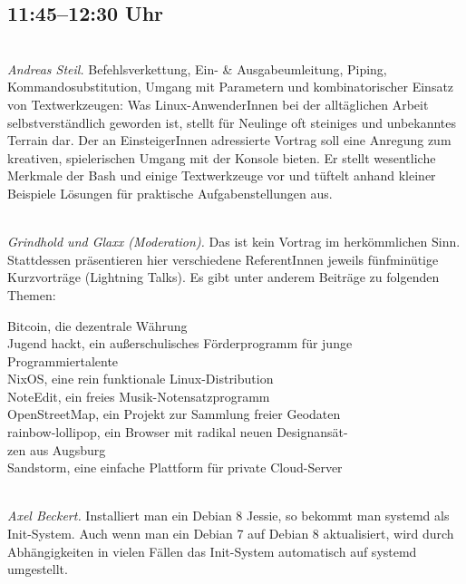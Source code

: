 \documentclass[10pt,a4paper,ngerman]{scrartcl}
\let\origdescription\description
\renewenvironment{description}{
  \setlength{\leftmargini}{0em}
  \origdescription
  \setlength{\itemindent}{0em}
  \setlength{\itemsep}{1.2em}
  \setlength{\labelsep}{\textwidth}
}
{\endlist}
\newcommand{\vorschub}{\mbox{}\\[-0.5em]}
\begin{document}
\begin{multicols}{2}
\begin{description}
\end{description}

\columnbreak

\section{11:45--12:30 Uhr}
\begin{description}
\item[Some Bashing – Kommandozeile für Einsteiger]\vorschub
\textsl{Andreas Steil.}
Befehlsverkettung, Ein- \& Ausgabeumleitung, Piping, Kommandosubstitution, Umgang mit Parametern und kombinatorischer Einsatz von Textwerkzeugen: Was Linux-AnwenderInnen bei der alltäglichen Arbeit selbstverständlich geworden ist, stellt für Neulinge oft steiniges und unbekanntes Terrain dar. Der an EinsteigerInnen adressierte Vortrag soll eine Anregung zum kreativen, spielerischen Umgang mit der Konsole bieten. Er stellt wesentliche Merkmale der Bash und einige Textwerkzeuge vor und tüftelt anhand kleiner Beispiele Lösungen für praktische Aufgabenstellungen aus.



\item[Lightning Talks]\vorschub
\textsl{Grindhold und Glaxx (Moderation).}
Das ist kein Vortrag im herkömmlichen Sinn. Stattdessen präsentieren hier verschiedene ReferentInnen jeweils fünfminütige Kurzvorträge (Lightning Talks). Es gibt unter anderem Beiträge zu folgenden Themen:

\textbullet{} Bitcoin, die dezentrale Währung \\[0.3em]
\textbullet{} Jugend hackt, ein außerschulisches Förderprogramm für junge \\
\phantom{\textbullet} Programmiertalente \\[0.3em]
\textbullet{} NixOS, eine rein funktionale Linux-Distribution \\[0.3em]
\textbullet{} NoteEdit, ein freies Musik-Notensatzprogramm \\[0.3em]
\textbullet{} OpenStreetMap, ein Projekt zur Sammlung freier Geodaten \\[0.3em]
\textbullet{} rainbow-lollipop, ein Browser mit radikal neuen Designansät- \\
\phantom{\textbullet} zen aus Augsburg \\[0.3em]
\textbullet{} Sandstorm, eine einfache Plattform für private Cloud-Server

\item[Wie betreibt man Debian 8 Jessie ohne systemd?]\vorschub
\textsl{Axel Beckert.}
Installiert man ein Debian 8 Jessie, so bekommt man systemd als Init-System. Auch wenn man ein Debian 7 auf Debian 8 aktualisiert, wird durch Abhängigkeiten in vielen Fällen das Init-System automatisch auf systemd umgestellt.


\end{description}
\end{multicols}
\end{document}
